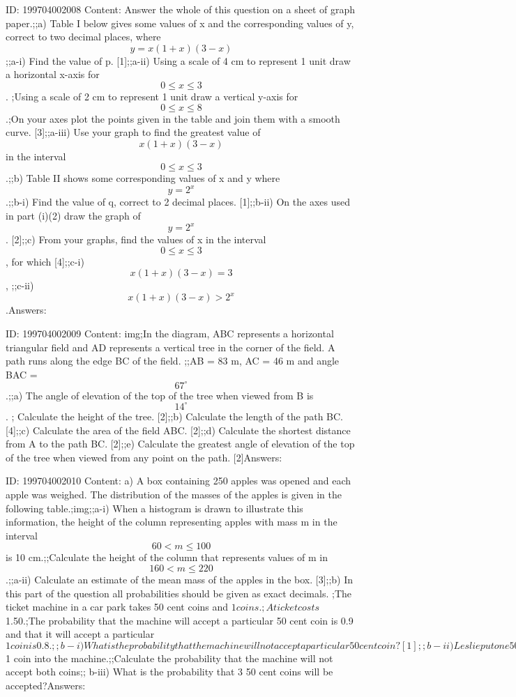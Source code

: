 \documentclass{article}
\begin{document}
ID: 199704002008
Content:
Answer the whole of this question on a sheet of graph paper.;;a) Table I below gives some values of x and the corresponding values of y, correct to two decimal places, where $$y = x(1 + x)(3 - x)$$;;a-i) Find the value of p. [1];;a-ii) Using a scale of 4 cm to represent 1 unit draw a horizontal x-axis for $$0 \leq x \leq 3$$. ;Using a scale of 2 cm to represent 1 unit draw a vertical y-axis for $$0 \leq x \leq 8$$.;On your axes plot the points given in the table and join them with a smooth curve. [3];;a-iii) Use your graph to find the greatest value of $$x(1 + x)(3 - x)$$ in the interval $$0 \leq x \leq 3$$.;;b) Table II shows some corresponding values of x and y where $$y = 2^x$$.;;b-i) Find the value of q, correct to 2 decimal places. [1];;b-ii) On the axes used in part (i)(2) draw the graph of $$y = 2^x$$. [2];;c) From your graphs, find the values of x in the interval $$0 \leq x \leq 3$$, for which [4];;c-i) $$x(1 + x)(3 - x) = 3$$, ;;c-ii) $$x(1 + x)(3 - x) > 2^x$$.Answers:

ID: 199704002009
Content:
img;In the diagram, ABC represents a horizontal triangular field and AD represents a vertical tree in the corner of the field. A path runs along the edge BC of the field. ;;AB = 83 m, AC = 46 m and angle BAC = $$67^{\circ}$$.;;a) The angle of elevation of the top of the tree when viewed from B is $$14^{\circ}$$. ; Calculate the height of the tree. [2];;b) Calculate the length of the path BC. [4];;c) Calculate the area of the field ABC. [2];;d) Calculate the shortest distance from A to the path BC. [2];;e) Calculate the greatest angle of elevation of the top of the tree when viewed from any point on the path. [2]Answers:

ID: 199704002010
Content:
a) A box containing 250 apples was opened and each apple was weighed. The distribution of the masses of the apples is given in the following table.;img;;a-i) When a histogram is drawn to illustrate this information, the height of the column representing apples with mass m in the interval $$60 < m \leq 100$$ is 10 cm.;;Calculate the height of the column that represents values of m in $$160 < m \leq 220$$.;;a-ii) Calculate an estimate of the mean mass of the apples in the box. [3];;b) In this part of the question all probabilities should be given as exact decimals. ;The ticket machine in a car park takes 50 cent coins and $1 coins. ;A ticket costs $1.50.;The probability that the machine will accept a particular 50 cent coin is 0.9 and that it will accept a particular $1 coin is 0.8.;;b-i) What is the probability that the machine will not accept a particular 50 cent coin? [1];;b-ii) Leslie put one 50 cent coin and one $1 coin into the machine.;;Calculate the probability that the machine will not accept both coins;; b-iii) What is the probability that 3 50 cent coins will be accepted?Answers:
\end{document}
